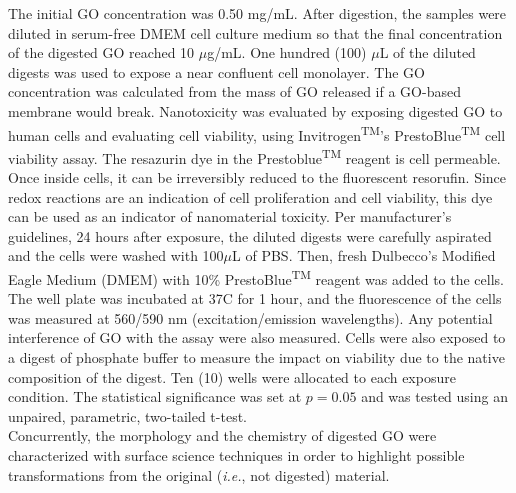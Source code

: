 The initial GO concentration was 0.50 mg/mL. After digestion, the samples were diluted in serum-free DMEM cell culture medium so that the final concentration of the digested GO reached 10 $\mu$g/mL. One hundred (100) $\mu$L of the diluted digests was used to expose a near confluent cell monolayer. The GO concentration was calculated from the mass of  GO released if a GO-based membrane would break.
Nanotoxicity was evaluated by exposing digested GO to human cells and evaluating cell viability, using Invitrogen\textsuperscript{TM}'s PrestoBlue\textsuperscript{TM} cell viability assay. The resazurin dye in the Prestoblue\textsuperscript{TM} reagent is cell permeable. Once inside cells, it can be irreversibly reduced to the fluorescent resorufin. Since redox reactions are an indication of cell proliferation and cell viability, this dye can be used as an indicator of nanomaterial toxicity. Per manufacturer's guidelines, 24 hours after exposure, the diluted digests were carefully aspirated and the cells were washed with 100$\mu$L of PBS. Then, fresh Dulbecco's Modified Eagle Medium (DMEM) with 10\% PrestoBlue\textsuperscript{TM} reagent was added to the cells. The well plate was incubated at 37\textdegree C for 1 hour, and the fluorescence of the cells was measured at 560/590 nm (excitation/emission wavelengths). Any potential interference of GO with the assay were also measured. Cells were also exposed to a digest of phosphate buffer to measure the impact on viability due to the native composition of the digest. Ten (10) wells were allocated to each exposure condition. The statistical significance was set at $p = 0.05$ and was tested using an unpaired, parametric, two-tailed t-test.\\
Concurrently, the morphology and the chemistry of digested GO were characterized with surface science techniques in order to highlight possible transformations from the original (\textit{i.e.}, not digested) material. 

